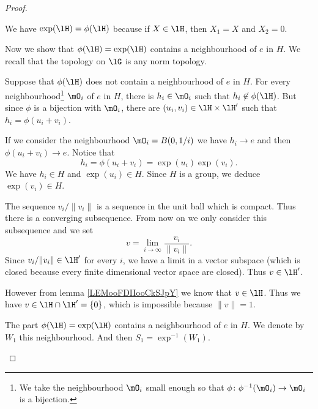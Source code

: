 \begin{proof}
\begin{subproof}
		\spitem[Image]
		We have \( \exp(\lH)=\phi(\lH)\) because if \( X\in \lH\), then \( X_1=X\) and \( X_2=0\).


		Now we show that \( \phi(\lH)=\exp(\lH)\) contains a neighbourhood of \( e\) in \( H\). We recall that the topology on \( \lG\) is any norm topology.

		Suppose that \( \phi(\lH)\) does not contain a neighbourhood of \( e\) in \( H\). For every neighbourhood\footnote{We take the neighbourhood \( \mO_i\) small enough so that \(\phi \colon \phi^{-1}(\mO_i)\to \mO_i  \) is a bijection.} \( \mO_i\) of \( e\) in \( H\), there is \( h_i\in\mO_i\) such that \( h_i\not\in\phi(\lH)\). But since \( \phi\) is a bijection with \( \mO_i\), there are \( (u_i,v_i)\in\lH\times \lH'\) such that \( h_i=\phi(u_i+v_i)\).

		If we consider the neighbourhood \( \mO_i=B(0,1/i)\) we have \( h_i\to e\) and then \( \phi(u_i+v_i)\to e\). Notice that
		\begin{equation}
			h_i=\phi(u_i+v_i)=\exp(u_i)\exp(v_i).
		\end{equation}
		We have \( h_i\in H\) and \( \exp(u_i)\in H\). Since \( H\) is a group, we deduce \( \exp(v_i)\in H\).

		The sequence \( v_i/\| v_i \|\) is a sequence in the unit ball which is compact. Thus there is a converging subsequence. From now on we only consider this subsequence and we set
		\begin{equation}
			v=\lim_{i\to \infty}\frac{ v_i }{ \| v_i \| }.
		\end{equation}
		Since \( v_i/\| v_i \|\in \lH'\) for every \( i\), we have a limit in a vector subspace (which is closed because every finite dimensional vector space are closed). Thus \( v\in \lH'\).

		However from lemma \ref{LEMooFDIIooCkSJpY} we know that \( v\in\lH\). Thus we have \( v\in\lH\cap\lH'=\{ 0 \}\), which is impossible because \( \| v \|=1\).


		The part \( \phi(\lH)=\exp(\lH)\) contains a neighbourhood of \( e\) in \( H\). We denote by \( W_1\) this neighbourhood. And then \( S_1=\exp^{-1}(W_1)\).


\end{subproof}
\end{proof}
